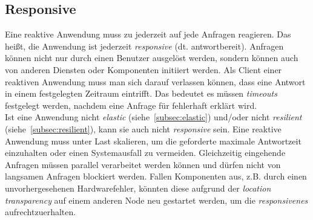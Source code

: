 \subsection{Responsive}\label{subsec:responsive}
Eine reaktive Anwendung muss zu jederzeit auf jede Anfragen reagieren. Das heißt, die Anwendung ist jederzeit \textit{responsive} (dt. antwortbereit). Anfragen können nicht nur durch einen Benutzer ausgelöst werden, sondern können auch von anderen Diensten oder Komponenten initiiert werden. Als Client einer reaktiven Anwendung muss man sich darauf verlassen können, dass eine Antwort in einem festgelegten Zeitraum eintrifft. Das bedeutet es müssen \textit{timeouts} festgelegt werden, nachdem eine Anfrage für fehlerhaft erklärt wird.\\
Ist eine Anwendung nicht \textit{elastic} (siehe~\ref{subsec:elastic}) und/oder nicht \textit{resilient} (siehe~\ref{subsec:resilient}), kann sie auch nicht \textit{responsive} sein. Eine reaktive Anwendung muss unter Last skalieren, um die geforderte maximale Antwortzeit einzuhalten oder einen Systemausfall zu vermeiden. Gleichzeitig eingehende Anfragen müssen parallel verarbeitet werden können und dürfen nicht von langsamen Anfragen blockiert werden. Fallen Komponenten aus, z.B. durch einen unvorhergesehenen Hardwarefehler, könnten diese aufgrund der \textit{location transparency} auf einem anderen Node neu gestartet werden, um die \textit{responsivenes} aufrechtzuerhalten.

\pagebreak

